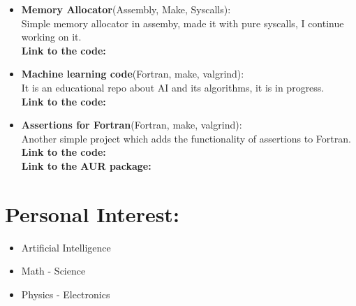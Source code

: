 \documentclass{article}
\begin{document}
\begin{minipage}[t]{8cm}
\begin{itemize}
\item \textbf{Memory Allocator}(Assembly, Make, Syscalls):\\
  Simple memory allocator in assemby, made it with pure syscalls, I continue working on it.\\
  \textbf{Link to the code:} \href{https://github.com/alecksandr26/memory-allocator}{\color{Blue}{GitHub}}
\item \textbf{Machine learning code}(Fortran, make, valgrind):\\
  It is an educational repo about AI and its algorithms, it is in progress.\\
  \textbf{Link to the code:} \href{https://github.com/alecksandr26/fortran-ml}{\color{Blue}{GitHub}}
\item \textbf{Assertions for Fortran}(Fortran, make, valgrind):\\
  Another simple project which adds the functionality of assertions to Fortran.\\
  \textbf{Link to the code:} \href{https://github.com/alecksandr26/assert-fortran-git}{\color{Blue}{GitHub}}\\
  \textbf{Link to the AUR package:}
  \href{https://aur.archlinux.org/packages/assert-fortran-git}{\color{Blue}{AUR}}
\end{itemize}

\section*{Personal Interest:}
\begin{itemize}
\item Artificial Intelligence
\item Math - Science
\item Physics - Electronics
\end{itemize}

\end{minipage}
\end{document}
